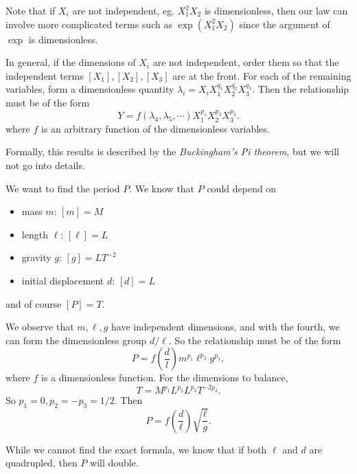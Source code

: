 \documentclass[a4paper]{article}
\begin{document}
Note that if $X_i$ are not independent, eg. $X_1^2X_2$ is dimensionless, then our law can involve more complicated terms such as $\exp (X_1^2 X_2)$ since the argument of $\exp$ is dimensionless.

In general, if the dimensions of $X_i$ are not independent, order them so that the independent terms $[X_1], [X_2], [X_3]$ are at the front. For each of the remaining variables, form a dimensionless quantity $\lambda_i = X_iX_1^{q_1}X_2^{q_2}X_3^{q_3}$.
Then the relationship must be of the form
\[
  Y = f(\lambda_4, \lambda_5, \cdots) X_1^{p_1}X_2^{p_2}X_3^{p_3}.
\]
where $f$ is an arbitrary function of the dimensionless variables.

Formally, this results is described by the \emph{Buckingham's Pi theorem}, but we will not go into details.

\begin{eg}\leavevmode
  \begin{center}
  \end{center}
  We want to find the period $P$. We know that $P$ could depend on 
  \begin{itemize}
    \item mass $m$: $[m] = M$
    \item length $\ell$: $[\ell] = L$
    \item gravity $g$: $[g] = LT^{-2}$
    \item initial displacement $d$: $[d] = L$
  \end{itemize}
  and of course $[P] = T$.

  We observe that $m, \ell, g$ have independent dimensions, and with the fourth, we can form the dimensionless group $d/\ell$. So the relationship must be of the form
  \[
    P = f\left(\frac{d}{l}\right) m^{p_1}\ell^{p_2}g^{p_3},
  \]
  where $f$ is a dimensionless function. For the dimensions to balance,
  \[
    T = M^{p_1}L^{p_2}L^{p_3}T^{-2p_3}.
  \]
  So $p_1 = 0, p_2 = -p_3 = 1/2$. Then
  \[
    P = f\left(\frac{d}{\ell}\right) \sqrt{\frac{\ell}{g}}.
  \]

  While we cannot find the exact formula, we know that if both $\ell$ and $d$ are quadrupled, then $P$ will double. 
\end{eg}
\end{document}
